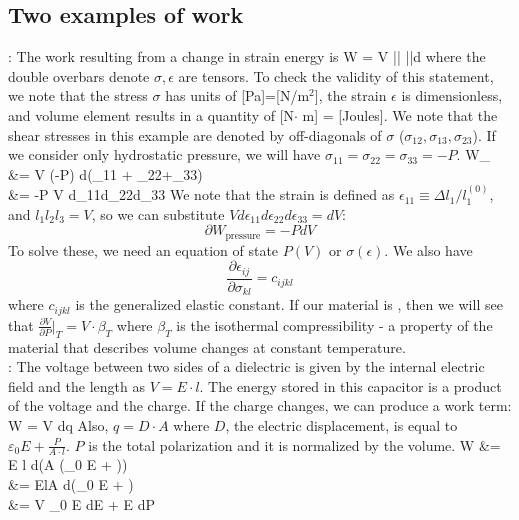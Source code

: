 \documentclass[12pt]{article}
\begin{document}
\subsection{Two examples of work}
: The work resulting from a change in strain energy is 
\eqs
\partial W = V \bar{\bar{\sigma}} \cdot \bar{\bar{d\epsilon}}
\eqe 
where the double overbars denote $\sigma, \epsilon$ are tensors.  To check the validity of this statement, we note that the stress $\sigma$ has units of [Pa]=[N/$\text{m}^2$], the strain $\epsilon$ is dimensionless, and volume element results in a quantity of [N$\cdot$ m] = [Joules]. We note that the shear stresses in this example are denoted by off-diagonals of $\sigma$ ($\sigma_{12}, \sigma_{13}, \sigma_{23}$).  If we consider only hydrostatic pressure, we will have $\sigma_{11}=\sigma_{22}=\sigma_{33}=-P$.
\eqs
\partial W_ &= V \cdot (-P) d(\epsilon_{11} + \epsilon_{22}+\epsilon_{33})\\
&= -P V d\epsilon_{11}d\epsilon_{22}d\epsilon_{33}
\eqe
We note that the strain is defined as $\epsilon_{11} \equiv \Delta l_1 / l_1^{(0)}$, and $l_1 l_2 l_3 = V$, so we can substitute $V d\epsilon_{11} d\epsilon_{22}d\epsilon_{33} = dV$:
\begin{equation}
\partial W_\text{pressure} = -P dV
\end{equation}
To solve these, we need an equation of state $P(V)$ or $\sigma(\epsilon)$.  We also have
\begin{equation}
\frac{\partial \epsilon_{ij}}{\partial \sigma_{kl}} = c_{ijkl}
\end{equation}
where $c_{ijkl}$ is the generalized elastic constant.  If our material is , then we will see that $\frac{\partial V}{\partial P}|_T = V \cdot \beta_T$ where $\beta_T$ is the isothermal compressibility - a property of the material that describes volume changes at constant temperature.\\

: The voltage between two sides of a dielectric is given by the internal electric field and the length as $V = E \cdot l$.  The energy stored in this capacitor is a product of the voltage and the charge.  If the charge changes, we can produce a work term:
\eqs
\delta W = V dq
\eqe
Also, $q=D \cdot A$ where $D$, the electric displacement, is equal to $\varepsilon_0 E + \frac{P}{A\cdot l}$.  $P$ is the total polarization and it is normalized by the volume.
\eqs
\delta W &= E l  \cdot d(A (\varepsilon_0 E + ))\\
&= ElA \cdot d(\varepsilon_0 E + )\\
&= V \varepsilon_0 E dE + E dP
\eqe
\end{document}
